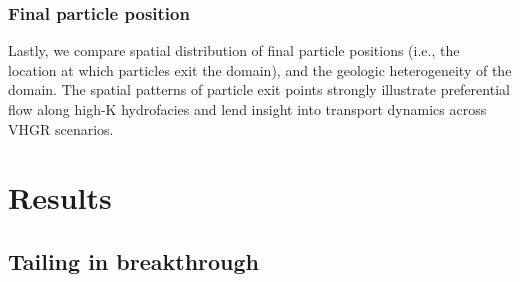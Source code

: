 %
%
\subsubsection{Final particle position}
\label{ss_rtd_pp}

Lastly, we compare %
spatial distribution of final particle positions (i.e., the location at which particles exit the domain), and the geologic heterogeneity of the domain. The spatial patterns of particle exit points strongly illustrate preferential flow along high-K hydrofacies and lend insight into transport dynamics across VHGR scenarios.







\section{Results}
\label{s_3}



%
%

\subsection{Tailing in breakthrough}
\label{ss_3_1}

